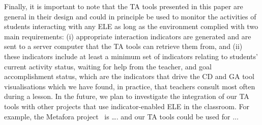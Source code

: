 Finally, it is important to note that the TA tools presented in this
paper are general in their design and could in principle be used to
monitor the activities of students interacting with any ELE as long as
the environment complied with two main requirements: (i) appropriate
interaction indicators are generated and are sent to a server computer
that the TA tools can retrieve them from, and (ii) these indicators
include at least a minimum set of indicators relating to students’
current activity status, waiting for help from the teacher, and goal
accomplishment status, which are the indicators that drive the CD and
GA tool visualisations which we have found, in practice, that teachers
consult most often during a lesson. In the future, we plan to
investigate the integration of our TA tools with other projects that
use indicator-enabled ELE in the classroom. For example, the Metafora
project~\cite{metafora} is …. and our TA tools could be used for ...

